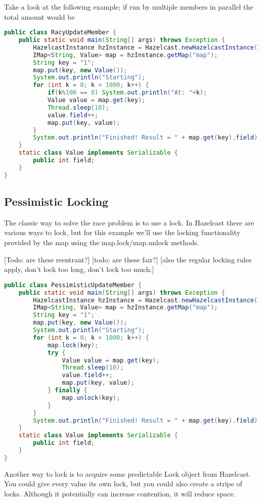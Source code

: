 Take a look at the following example; if run by multiple members in parallel the total amount would be 
\begin{lstlisting}[language=java]
public class RacyUpdateMember {
    public static void main(String[] args) throws Exception {
        HazelcastInstance hzInstance = Hazelcast.newHazelcastInstance();
        IMap<String, Value> map = hzInstance.getMap("map");
        String key = "1";
        map.put(key, new Value());
        System.out.println("Starting");
        for (int k = 0; k < 1000; k++) {
            if(k%100 == 0) System.out.println("At: "+k);
            Value value = map.get(key);
            Thread.sleep(10);
            value.field++;
            map.put(key, value);
        }
        System.out.println("Finished! Result = " + map.get(key).field);
    }
    static class Value implements Serializable {
        public int field;
    }
}
\end{lstlisting}

\subsection{Pessimistic Locking}
The classic way to solve the race problem is to use a lock. In Hazelcast there are various ways to lock, but for this example we'll use the locking functionality provided by the map using the map.lock/map.unlock methods.

[Todo: are these reentrant?]
[todo: are these fair?]
[also the regular locking rules apply, don't lock too long, don't lock too much.]

\begin{lstlisting}[language=java]
public class PessimisticUpdateMember {
    public static void main(String[] args) throws Exception {
        HazelcastInstance hzInstance = Hazelcast.newHazelcastInstance();
        IMap<String, Value> map = hzInstance.getMap("map");
        String key = "1";
        map.put(key, new Value());
        System.out.println("Starting");
        for (int k = 0; k < 1000; k++) {
            map.lock(key);
            try {
                Value value = map.get(key);
                Thread.sleep(10);
                value.field++;
                map.put(key, value);
            } finally {
                map.unlock(key);
            }
        }
        System.out.println("Finished! Result = " + map.get(key).field);
    }
    static class Value implements Serializable {
        public int field;
    }
}
\end{lstlisting}
Another way to lock is to acquire some predictable Lock object from Hazelcast. You could give every value its own lock, but you could also create a stripe of locks. Although it potentially can increase contention, it will reduce space.

